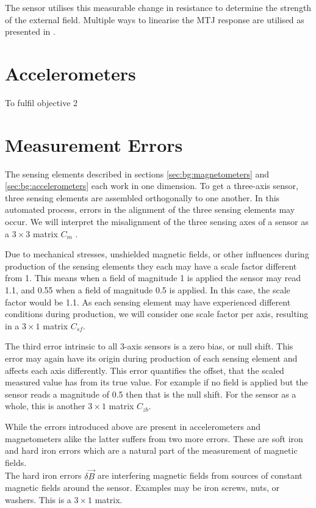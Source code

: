 The sensor utilises this measurable change in resistance to determine the strength of the external field. Multiple ways to linearise the \ac{MTJ} response are utilised as presented in \cite{yan2022}.

\section{Accelerometers \label{sec:bg:accelerometers}}
To fulfil objective 2

\section{Measurement Errors \label{sec:bg:measurement_errors}}
The sensing elements described in sections \ref{sec:bg:magnetometers} and \ref{sec:bg:accelerometers} each work in one dimension. To get a three-axis sensor, three sensing elements are assembled orthogonally to one another. In this automated process, errors in the alignment of the three sensing elements may occur. We will interpret the misalignment of the three sensing axes of a sensor as a $3\times3$ matrix $C_{m}$ \cite{magcal}\cite{non-orthonogality}.

Due to mechanical stresses, unshielded magnetic fields, or other influences during production of the sensing elements they each may have a scale factor different from 1. This means when a field of magnitude 1 is applied the sensor may read 1.1, and 0.55 when a field of magnitude 0.5 is applied. In this case, the scale factor would be 1.1. As each sensing element may have experienced different conditions during production, we will consider one scale factor per axis, resulting in a $3\times1$ matrix $C_{sf}$.

The third error intrinsic to all 3-axis sensors is a zero bias, or null shift. This error may again have its origin during production of each sensing element and affects each axis differently. This error quantifies the offset, that the scaled measured value has from its true value. For example if no field is applied but the sensor reads a magnitude of 0.5 then that is the null shift. For the sensor as a whole, this is another $3\times1$ matrix $C_{zb}$.

While the errors introduced above are present in accelerometers and magnetometers alike the latter suffers from two more errors. These are soft iron and hard iron errors which are a natural part of the measurement of magnetic fields.\\
The hard iron errors $\delta\vec{B}$ are interfering magnetic fields from sources of constant magnetic fields around the sensor. Examples may be iron screws, nuts, or washers. This is a $3\times1$ matrix.

